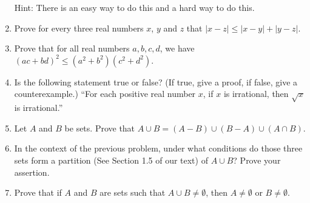 \documentclass[12pt]{article}
\begin{document}
\begin{enumerate}
  Hint: There is an easy way to do this and a hard way to do this.

\item Prove for every three real numbers $x$, $y$ and $z$ that $|x - z| \leq |x - y| + |y - z|$. 


\item Prove that for all real numbers $a,b,c,d$, we have $(ac+bd)^2\leq (a^2+b^2)(c^2+d^2)$.

\item 
  Is the following statement true or false? (If true, give a proof, if false, give a counterexample.)\newline
  ``For each positive real number $x$, if $x$ is irrational, then $\sqrt{x}$ is irrational.''


\item Let $A$ and $B$ be sets. Prove that $A\cup B = (A - B) \cup (B - A) \cup (A \cap B)$.

\item In the context of the previous problem, under what conditions do those three sets form a partition
  (See Section 1.5 of our text) of $A\cup B$?
  Prove your assertion.


\item Prove that if $A$ and $B$ are sets such that $A\cup B\neq\emptyset$, then $A\neq\emptyset$ or $B\neq\emptyset$.


\end{enumerate}
\end{document}
